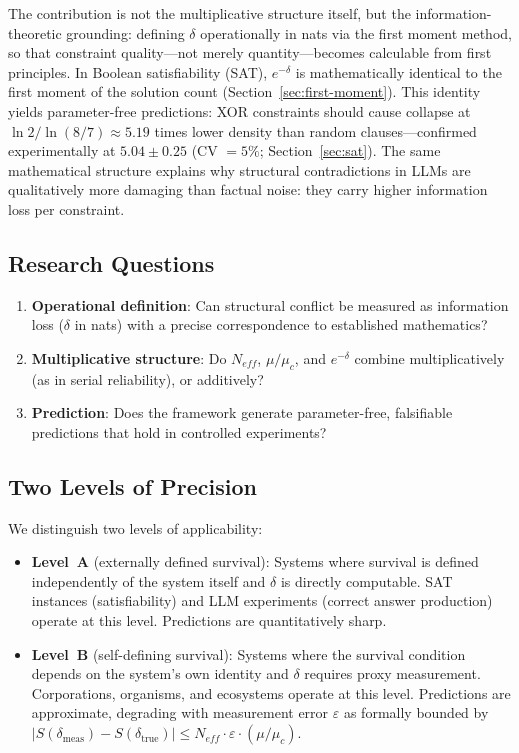 \documentclass[11pt,a4paper]{article}
\begin{document}
The contribution is not the multiplicative structure itself, but the information-theoretic grounding: defining $\delta$ operationally in nats via the first moment method, so that constraint quality---not merely quantity---becomes calculable from first principles. In Boolean satisfiability (SAT), $e^{-\delta}$ is mathematically identical to the first moment of the solution count (Section~\ref{sec:first-moment}). This identity yields parameter-free predictions: XOR constraints should cause collapse at $\ln 2 / \ln(8/7) \approx 5.19$ times lower density than random clauses---confirmed experimentally at $5.04 \pm 0.25$ (CV $= 5\%$; Section~\ref{sec:sat}). The same mathematical structure explains why structural contradictions in LLMs are qualitatively more damaging than factual noise: they carry higher information loss per constraint.

\subsection{Research Questions}

\begin{enumerate}
    \item \textbf{Operational definition}: Can structural conflict be measured as information loss ($\delta$ in nats) with a precise correspondence to established mathematics?
    \item \textbf{Multiplicative structure}: Do $N_{eff}$, $\mu/\mu_c$, and $e^{-\delta}$ combine multiplicatively (as in serial reliability), or additively?
    \item \textbf{Prediction}: Does the framework generate parameter-free, falsifiable predictions that hold in controlled experiments?
\end{enumerate}

\subsection{Two Levels of Precision}

We distinguish two levels of applicability:

\begin{itemize}
    \item \textbf{Level~A} (externally defined survival): Systems where survival is defined independently of the system itself and $\delta$ is directly computable. SAT instances (satisfiability) and LLM experiments (correct answer production) operate at this level. Predictions are quantitatively sharp.

    \item \textbf{Level~B} (self-defining survival): Systems where the survival condition depends on the system's own identity and $\delta$ requires proxy measurement. Corporations, organisms, and ecosystems operate at this level. Predictions are approximate, degrading with measurement error $\varepsilon$ as formally bounded by $|S(\delta_{\text{meas}}) - S(\delta_{\text{true}})| \leq N_{eff} \cdot \varepsilon \cdot (\mu/\mu_c)$.
\end{itemize}
\end{document}

